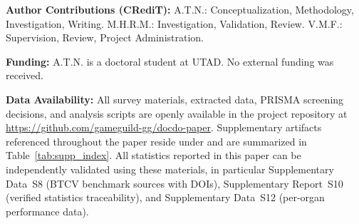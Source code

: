 \textbf{Author Contributions (CRediT):} A.T.N.: Conceptualization, Methodology, Investigation, Writing. M.H.R.M.: Investigation, Validation, Review. V.M.F.: Supervision, Review, Project Administration.

\textbf{Funding:} A.T.N. is a doctoral student at UTAD. No external funding was received.

\textbf{Data Availability:} All survey materials, extracted data, PRISMA screening decisions, and analysis scripts are openly available in the project repository at \url{https://github.com/gameguild-gg/docdo-paper}. Supplementary artifacts referenced throughout the paper reside under  and are summarized in Table~\ref{tab:supp_index}. All statistics reported in this paper can be independently validated using these materials, in particular Supplementary Data~S8 (BTCV benchmark sources with DOIs), Supplementary Report~S10 (verified statistics traceability), and Supplementary Data~S12 (per-organ performance data).

